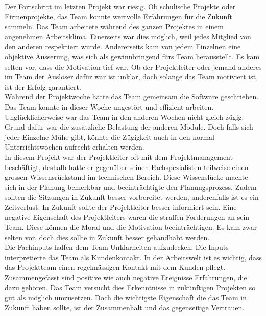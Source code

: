 Der Fortschritt im letzten Projekt war riesig. Ob schulische Projekte oder Firmenprojekte, das Team konnte wertvolle Erfahrungen für die Zukunft sammeln. Das Team arbeitete während des ganzen Projektes in einem angenehmen Arbeitsklima. Einerseits war dies möglich, weil jedes Mitglied von den anderen respektiert wurde. Andererseits kam von jedem Einzelnen eine objektive Äusserung, was sich als gewinnbringend fürs Team herausstellt. Es kam selten vor, dass die Motivation tief war. Ob der Projektleiter oder jemand anderes im Team der Auslöser dafür war ist unklar, doch solange das Team motiviert ist, ist der Erfolg garantiert.\\ 
Während der Projektwoche hatte das Team gemeinsam die Software geschrieben. Das Team konnte in dieser Woche ungestört und effizient arbeiten. Unglücklicherweise war das Team in den anderen Wochen nicht gleich zügig. Grund dafür war die zusätzliche Belastung der anderen Module. Doch falls sich jeder Einzelne Mühe gibt, könnte die Zügigkeit auch in den normal Unterrichtswochen aufrecht erhalten werden.\\  
In diesem Projekt war der Projektleiter oft mit dem Projektmanagement beschäftigt, deshalb hatte er gegenüber seinen Fachspezialisten teilweise einen grossen Wissensrückstand im technischen Bereich. Diese Wissenslücke machte sich in der Planung bemerkbar und beeinträchtigte den Planungsprozess. Zudem sollten die Sitzungen in Zukunft besser vorbereitet werden, anderenfalls ist es ein Zeitverlust. In Zukunft sollte der Projektleiter besser informiert sein. Eine negative Eigenschaft des Projektleiters waren die straffen Forderungen an sein Team. Diese können die Moral und die Motivation beeinträchtigen. Es kam zwar selten vor, doch dies sollte in Zukunft besser gehandhabt werden.\\ 
Die Fachinputs halfen dem Team Unklarheiten aufzudecken. Die Inputs interpretierte das Team als Kundenkontakt. In der Arbeitswelt ist es wichtig, dass das Projektteam einen regelmässigen Kontakt mit dem Kunden pflegt.\\
Zusammengefasst sind positive wie auch negative Ereignisse Erfahrungen, die dazu gehören. Das Team versucht dies Erkenntnisse in zukünftigen Projekten so gut als möglich umzusetzen. Doch die wichtigste Eigenschaft die das Team in Zukunft haben sollte, ist der Zusammenhalt und das gegenseitige Vertrauen.